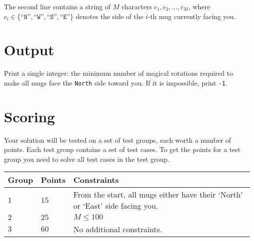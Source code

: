 The second line contains a string of $M$ characters $c_1, c_2, \dots, c_M$, where $c_i \in \{\texttt{``N''},\texttt{``W''},\texttt{``S''},\texttt{``E''}\}$ denotes the side of the $i$-th mug currently facing you.

\section*{Output}
Print a single integer: the minimum number of magical rotations required to make all mugs face the \texttt{North} side toward you. If it is impossible, print \texttt{-1}.

\section*{Scoring}
Your solution will be tested on a set of test groups, each worth a number of points. Each test group contains
a set of test cases. To get the points for a test group you need to solve all test cases in the test group.

\noindent
\begin{tabular}{| l | l | p{12cm} |}
  \hline
  \textbf{Group} & \textbf{Points} & \textbf{Constraints} \\ \hline
  $1$    & $15$       & From the start, all mugs either have their `North' or `East' side facing you. \\ \hline
  $2$    & $25$       & $M \leq 100$ \\ \hline
  $3$    & $60$       & No additional constraints. \\ \hline
\end{tabular}



